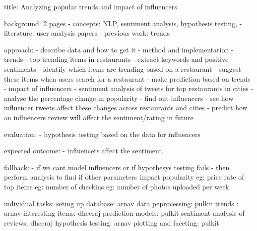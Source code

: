 title: Analyzing popular trends and impact of influencers

background: 2 pages
- concepts: NLP, sentiment analysis, hypothesis testing, 
- literature: user analysis papers
- previous work: trends

approach:
- describe data and how to get it
- method and implementation
 - trends
 - top trending items in restaurants
   - extract keywords and positive sentiments
   - identify which items are trending based on a restaurant
   - suggest these items when users search for a restaurant
   - make prediction based on trends
 - impact of influencers
   - sentiment analysis of tweets for top restaurants in cities
   - analyse the percentage change in popularity
   - find out influencers
   - see how influencer tweets affect these changes across restaurants and cities
   - predict how an influencers review will affect the sentiment/rating in future
   
evaluation:
- hypothesis testing based on the data for influencers

expected outcome:
- influencers affect the sentiment.

fallback:
- if we cant model influencers or if hypothesys testing fails
- then perform analysis to find if other parameters impact popularity
 eg: price rate of top items
 eg: number of checkins
 eg: number of photos uploaded per week

individual tasks:
 seting up database: arnav
 data peprocessing: pulkit
 trends : arnav
 interesting items: dheeraj
 prediction models: pulkit
 sentiment analysis of reviews: dheeraj
 hypothesis testing: arnav
 plotting and faceting: pulkit 
